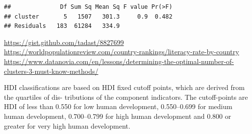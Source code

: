 \documentclass[]{article}
\newenvironment{Shaded}{\begin{snugshade}}{\end{snugshade}}
\newcommand{\CommentTok}[1]{\textcolor[rgb]{0.56,0.35,0.01}{\textit{#1}}}
\newcommand{\DataTypeTok}[1]{\textcolor[rgb]{0.13,0.29,0.53}{#1}}
\newcommand{\DecValTok}[1]{\textcolor[rgb]{0.00,0.00,0.81}{#1}}
\newcommand{\KeywordTok}[1]{\textcolor[rgb]{0.13,0.29,0.53}{\textbf{#1}}}
\newcommand{\NormalTok}[1]{#1}
\newcommand{\OperatorTok}[1]{\textcolor[rgb]{0.81,0.36,0.00}{\textbf{#1}}}
\newcommand{\StringTok}[1]{\textcolor[rgb]{0.31,0.60,0.02}{#1}}
\begin{document}
\begin{verbatim}
##              Df Sum Sq Mean Sq F value Pr(>F)
## cluster       5   1507   301.3     0.9  0.482
## Residuals   183  61284   334.9
\end{verbatim}

\url{https://gist.github.com/tadast/8827699}
\url{https://worldpopulationreview.com/country-rankings/literacy-rate-by-country}
\url{https://www.datanovia.com/en/lessons/determining-the-optimal-number-of-clusters-3-must-know-methods/}

\begin{Shaded}
\end{Shaded}

HDI classifications are based on HDI fixed cutoff points, which are
derived from the quartiles of dis- tributions of the component
indicators. The cutoff-points are HDI of less than 0.550 for low human
development, 0.550--0.699 for medium human development, 0.700--0.799 for
high human development and 0.800 or greater for very high human
development.
\end{document}
